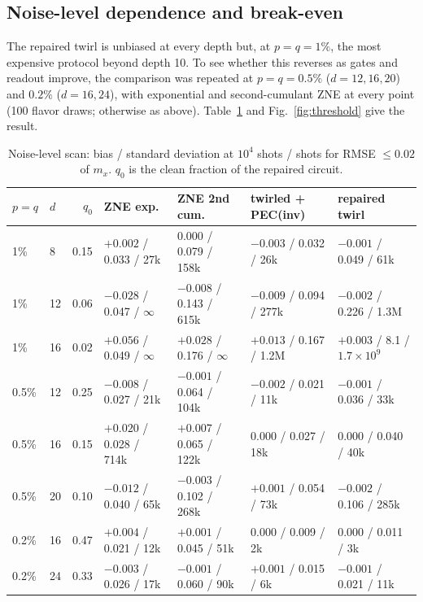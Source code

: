 \documentclass[11pt,a4paper]{article}
\theoremstyle{remark}
\begin{document}
\subsection{Noise-level dependence and break-even}
\label{sec:threshold}

The repaired twirl is unbiased at every depth but, at $p=q=1\%$, the most expensive protocol beyond depth 10. To see whether this reverses as gates and readout improve, the comparison was repeated at $p=q=0.5\%$ ($d=12,16,20$) and $0.2\%$ ($d=16,24$), with exponential and second-cumulant ZNE at every point (100 flavor draws; otherwise as above). Table~\ref{tab:threshold} and Fig.~\ref{fig:threshold} give the result.

\begin{table}[h]
\centering\small
\caption{Noise-level scan: bias / standard deviation at $10^4$ shots / shots for RMSE $\le0.02$ of $m_x$. $q_0$ is the clean fraction of the repaired circuit.}
\label{tab:threshold}
\setlength{\tabcolsep}{3pt}\footnotesize
\begin{tabular}{llrllll}
\toprule
$p{=}q$ & $d$ & $q_0$ & ZNE exp. & ZNE 2nd cum. & twirled + PEC(inv) & repaired twirl \\
\midrule
1\% & 8 & 0.15 & $+0.002$ / 0.033 / 27k & $0.000$ / 0.079 / 158k & $-0.003$ / 0.032 / 26k & $-0.001$ / 0.049 / 61k \\
1\% & 12 & 0.06 & $-0.028$ / 0.047 / $\infty$ & $-0.008$ / 0.143 / 615k & $-0.009$ / 0.094 / 277k & $-0.002$ / 0.226 / 1.3M \\
1\% & 16 & 0.02 & $+0.056$ / 0.049 / $\infty$ & $+0.028$ / 0.176 / $\infty$ & $+0.013$ / 0.167 / 1.2M & $+0.003$ / 8.1 / $1.7{\times}10^9$ \\
0.5\% & 12 & 0.25 & $-0.008$ / 0.027 / 21k & $-0.001$ / 0.064 / 104k & $-0.002$ / 0.021 / 11k & $-0.001$ / 0.036 / 33k \\
0.5\% & 16 & 0.15 & $+0.020$ / 0.028 / 714k & $+0.007$ / 0.065 / 122k & $0.000$ / 0.027 / 18k & $0.000$ / 0.040 / 40k \\
0.5\% & 20 & 0.10 & $-0.012$ / 0.040 / 65k & $-0.003$ / 0.102 / 268k & $+0.001$ / 0.054 / 73k & $-0.002$ / 0.106 / 285k \\
0.2\% & 16 & 0.47 & $+0.004$ / 0.021 / 12k & $+0.001$ / 0.045 / 51k & $0.000$ / 0.009 / 2k & $0.000$ / 0.011 / 3k \\
0.2\% & 24 & 0.33 & $-0.003$ / 0.026 / 17k & $-0.001$ / 0.060 / 90k & $+0.001$ / 0.015 / 6k & $-0.001$ / 0.021 / 11k \\
\bottomrule
\end{tabular}
\end{table}
\end{document}
